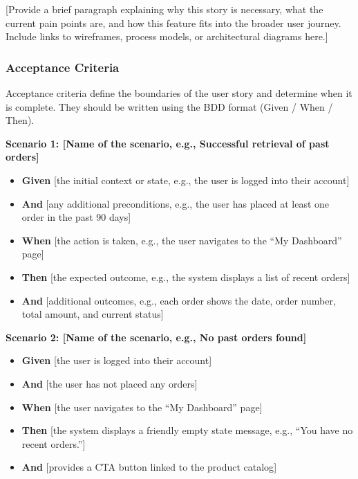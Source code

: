 {[}Provide a brief paragraph explaining why this story is necessary,
what the current pain points are, and how this feature fits into the
broader user journey. Include links to wireframes, process models, or
architectural diagrams here.{]}

\subsubsection{Acceptance Criteria}\label{acceptance-criteria}

Acceptance criteria define the boundaries of the user story and
determine when it is complete. They should be written using the BDD
format (Given / When / Then).

\textbf{Scenario 1: {[}Name of the scenario, e.g., Successful retrieval
of past orders{]}}

\begin{itemize}
\tightlist
\item
  \textbf{Given} {[}the initial context or state, e.g., the user is
  logged into their account{]}
\item
  \textbf{And} {[}any additional preconditions, e.g., the user has
  placed at least one order in the past 90 days{]}
\item
  \textbf{When} {[}the action is taken, e.g., the user navigates to the
  ``My Dashboard'' page{]}
\item
  \textbf{Then} {[}the expected outcome, e.g., the system displays a
  list of recent orders{]}
\item
  \textbf{And} {[}additional outcomes, e.g., each order shows the date,
  order number, total amount, and current status{]}
\end{itemize}

\textbf{Scenario 2: {[}Name of the scenario, e.g., No past orders
found{]}}

\begin{itemize}
\tightlist
\item
  \textbf{Given} {[}the user is logged into their account{]}
\item
  \textbf{And} {[}the user has not placed any orders{]}
\item
  \textbf{When} {[}the user navigates to the ``My Dashboard'' page{]}
\item
  \textbf{Then} {[}the system displays a friendly empty state message,
  e.g., ``You have no recent orders.''{]}
\item
  \textbf{And} {[}provides a CTA button linked to the product catalog{]}
\end{itemize}

